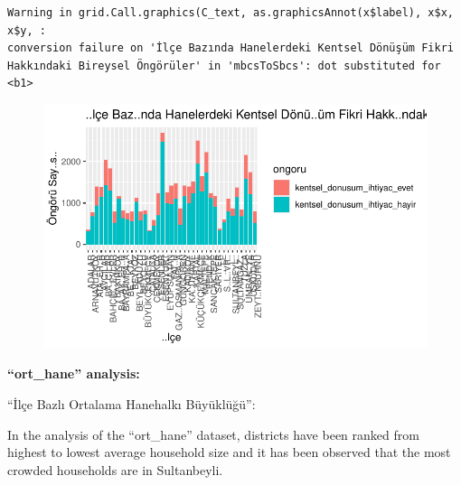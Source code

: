 \documentclass[
  11pt,
  a4paper,
  DIV=11,
  numbers=noendperiod]{scrartcl}
\begin{document}
\begin{verbatim}
Warning in grid.Call.graphics(C_text, as.graphicsAnnot(x$label), x$x, x$y, :
conversion failure on 'İlçe Bazında Hanelerdeki Kentsel Dönüşüm Fikri
Hakkındaki Bireysel Öngörüler' in 'mbcsToSbcs': dot substituted for <b1>
\end{verbatim}

\begin{figure}[H]

{\centering \includegraphics{project_files/figure-pdf/unnamed-chunk-14-1.pdf}

}

\end{figure}

\textbf{``ort\_hane'' analysis:}

``İlçe Bazlı Ortalama Hanehalkı Büyüklüğü'':

In the analysis of the ``ort\_hane'' dataset, districts have been ranked
from highest to lowest average household size and it has been observed
that the most crowded households are in Sultanbeyli.
\end{document}
